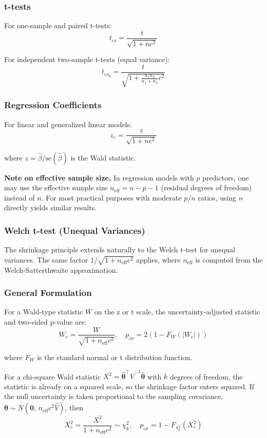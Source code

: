 \documentclass[
  11pt,
  letterpaper,
]{article}
\begin{document}
\subsubsection{t-tests}\label{t-tests}

For one-sample and paired t-tests:
\[t_{cs} = \dfrac{t}{\sqrt{1 + nc^2}}\]

For independent two-sample t-tests (equal variance):
\[t_{cs_p} = \dfrac{t}{\sqrt{1 + \frac{n_1 n_2}{n_1 + n_2} c^2}}\]

\subsubsection{Regression Coefficients}\label{regression-coefficients}

For linear and generalized linear models:
\[z_{c} = \dfrac{z}{\sqrt{1 + nc^2}}\]

where \(z = \hat{\beta}/\text{se}(\hat{\beta})\) is the Wald statistic.

\textbf{Note on effective sample size.} In regression models with \(p\)
predictors, one may use the effective sample size
\(n_{\text{eff}} = n - p - 1\) (residual degrees of freedom) instead of
\(n\). For most practical purposes with moderate \(p/n\) ratios, using
\(n\) directly yields similar results.

\subsubsection{Welch t-test (Unequal
Variances)}\label{welch-t-test-unequal-variances}

The shrinkage principle extends naturally to the Welch t-test for
unequal variances. The same factor \(1/\sqrt{1 + n_{\text{eff}}c^2}\)
applies, where \(n_{\text{eff}}\) is computed from the
Welch-Satterthwaite approximation.

\subsubsection{General Formulation}\label{general-formulation}

For a Wald-type statistic \(W\) on the z or t scale, the
uncertainty-adjusted statistic and two-sided p-value are:
\[W_{c} = \frac{W}{\sqrt{1 + n_{\text{eff}} c^2}}, \quad p_{c\sigma} = 2\left(1 - F_{W}(|W_c|)\right)\]

where \(F_W\) is the standard normal or t distribution function.

For a chi-square Wald statistic
\(X^2 = \hat{\boldsymbol\theta}^\top \hat{V}^{-1} \hat{\boldsymbol\theta}\)
with \(k\) degrees of freedom, the statistic is already on a squared
scale, so the shrinkage factor enters squared. If the null uncertainty
is taken proportional to the sampling covariance,
\(\boldsymbol\theta \sim N(\mathbf{0},\, n_{\text{eff}} c^2 \hat{V})\),
then
\[X^2_{c} = \frac{X^2}{1 + n_{\text{eff}} c^2} \sim \chi^2_k, \quad p_{c\sigma} = 1 - F_{\chi^2_k}(X^2_c)\]
\end{document}

